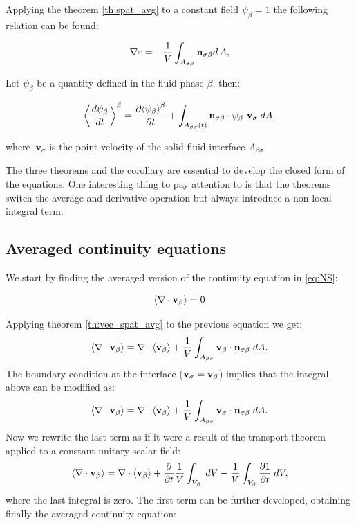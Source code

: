 \begin{corollary}
	Applying the theorem \eqref{th:spat_avg} to a constant field $\psi_{\beta} = 1$ the following relation can be found:
	
	\begin{equation}
		\nabla \varepsilon = - \dfrac{1}{V} \int_{A_{\sigma \beta}} \mathbf{n}_{\sigma \beta} d \, A,
					\label{th:vec_spat_avg_vec}
	\end{equation}
\end{corollary}

\newpage

\begin{theorem}
	Let $\psi_{\beta}$ be a quantity defined in the fluid phase $\beta$, then:
	
	\begin{equation}
	{\left< \dfrac{d \psi_{\beta}}{dt} \right>}^{\beta} =  \dfrac{\partial {\left< \psi_{\beta} \right>}^{\beta}}{\partial t} + \int_{A_{\beta \sigma}(t)}  \mathbf{n}_{\sigma \beta} \cdot \psi_{\beta}   \mathbf{\ v}_{\sigma} \;dA,
	\label{th:transport}
	\end{equation}
	
	\noindent where $\mathbf{\ v}_{\sigma}$ is the point velocity of the solid-fluid interface $A_{\beta \sigma}$.
\end{theorem}

The three theorems and the corollary are essential to develop the closed form of the equations.
One interesting thing to pay attention to is that the theorems switch the average and derivative operation but always introduce a non local integral term.

\subsection{Averaged continuity equations}
We start by finding the averaged version of the continuity equation in \eqref{eq:NS}:

\begin{equation}
{\left< \nabla \cdot \textbf{v}_{\beta}\right>}   = 0
\label{eq:superf_avg_cont}
\end{equation}

\noindent Applying theorem \eqref{th:vec_spat_avg} to the previous equation we get:
$$
{\left< \nabla \cdot \textbf{v}_{\beta} \right>} = \nabla \cdot {\left< \textbf{v}_{\beta}\right>} + \dfrac{1}{V} \int_{A_{\beta \sigma}}  \textbf{v}_{\beta} \cdot \mathbf{n}_{\sigma \beta} \;dA.
$$
The boundary condition at the interface ($\textbf{v}_{\sigma} = \textbf{v}_{\beta}$) implies that the integral above can be modified as: 
$${\left< \nabla \cdot \textbf{v}_{\beta} \right>}=\nabla \cdot {\left< \textbf{v}_{\beta}\right>} + \dfrac{1}{V} \int_{A_{\beta \sigma}}  \textbf{v}_{\sigma} \cdot \mathbf{n}_{\sigma \beta} \;dA. $$
Now we rewrite the last term as if it were a result of the transport theorem applied to a constant unitary scalar field:
$${\left< \nabla \cdot \textbf{v}_{\beta} \right>}=\nabla \cdot {\left< \textbf{v}_{\beta}\right>} + \dfrac{\partial }{\partial t} \dfrac{1}{V} \int_{V_\beta} \;dV  - \dfrac{1}{V} \int_{V_\beta} \dfrac{\partial 1}{\partial t} \;dV, $$
where the last integral is zero. The first term can be further developed, obtaining finally the averaged continuity equation:

